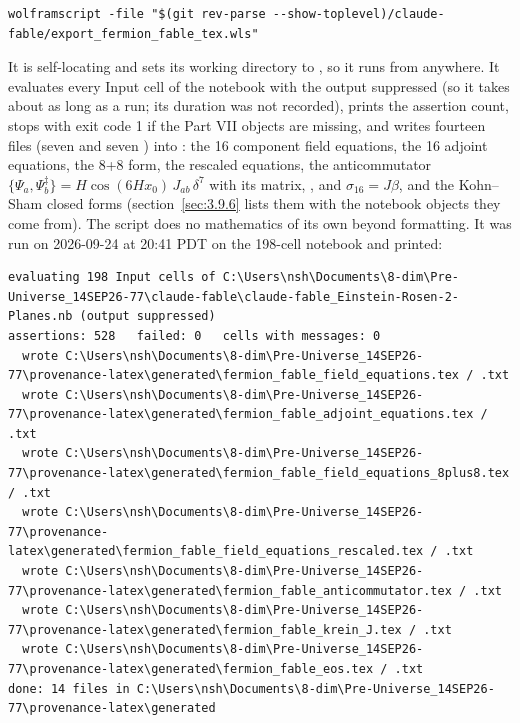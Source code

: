 \begin{Verbatim}
wolframscript -file "$(git rev-parse --show-toplevel)/claude-fable/export_fermion_fable_tex.wls"
\end{Verbatim}

It is self-locating and sets its working directory to , so it runs from anywhere. It evaluates every Input cell of the notebook with the output suppressed (so it takes about as long as a run; its duration was not recorded), prints the assertion count, stops with exit code 1 if the Part VII objects are missing, and writes fourteen files (seven  and seven ) into : the 16 component field equations, the 16 adjoint equations, the 8+8 form, the rescaled equations, the anticommutator $\{\Psi_a,\Psi^\ddagger_b\}=H\cos(6Hx_0)\,J_{ab}\,\delta^7$ with its matrix, ,  and $\sigma_{16} = J \beta$, and the Kohn--Sham closed forms (section~\ref{sec:3.9.6} lists them with the notebook objects they come from). The script does no mathematics of its own beyond formatting. It was run on 2026-09-24 at 20:41 PDT on the 198-cell notebook and printed:

\begin{Verbatim}
evaluating 198 Input cells of C:\Users\nsh\Documents\8-dim\Pre-Universe_14SEP26-77\claude-fable\claude-fable_Einstein-Rosen-2-Planes.nb (output suppressed)
assertions: 528   failed: 0   cells with messages: 0
  wrote C:\Users\nsh\Documents\8-dim\Pre-Universe_14SEP26-77\provenance-latex\generated\fermion_fable_field_equations.tex / .txt
  wrote C:\Users\nsh\Documents\8-dim\Pre-Universe_14SEP26-77\provenance-latex\generated\fermion_fable_adjoint_equations.tex / .txt
  wrote C:\Users\nsh\Documents\8-dim\Pre-Universe_14SEP26-77\provenance-latex\generated\fermion_fable_field_equations_8plus8.tex / .txt
  wrote C:\Users\nsh\Documents\8-dim\Pre-Universe_14SEP26-77\provenance-latex\generated\fermion_fable_field_equations_rescaled.tex / .txt
  wrote C:\Users\nsh\Documents\8-dim\Pre-Universe_14SEP26-77\provenance-latex\generated\fermion_fable_anticommutator.tex / .txt
  wrote C:\Users\nsh\Documents\8-dim\Pre-Universe_14SEP26-77\provenance-latex\generated\fermion_fable_krein_J.tex / .txt
  wrote C:\Users\nsh\Documents\8-dim\Pre-Universe_14SEP26-77\provenance-latex\generated\fermion_fable_eos.tex / .txt
done: 14 files in C:\Users\nsh\Documents\8-dim\Pre-Universe_14SEP26-77\provenance-latex\generated
\end{Verbatim}

